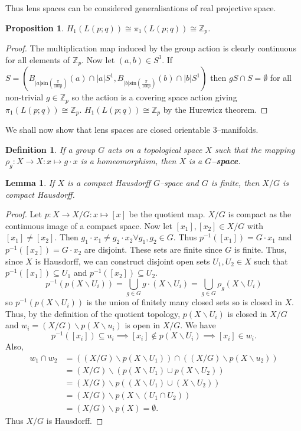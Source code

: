 \documentclass{article}
\newtheorem{definition}[theorem]{Definition}
\newtheorem{lemma}[theorem]{Lemma}
\newtheorem{proposition}[theorem]{Proposition}
\begin{document}
\noindent Thus lens spaces can be considered generalisations of real projective space.

\begin{proposition}
$H_1(L(p;q))\cong\pi_1(L(p;q))\cong \mathbb{Z}_p$.
\end{proposition}
\begin{proof}
The multiplication map induced by the group action is clearly continuous for all elements of $\mathbb{Z}_p$.
Now let $(a,b)\in S^3$. If $S=(B_{|a|\text{sin}(\frac{\pi}{100p})}(a)\cap |a|S^1,B_{|b|\text{sin}(\frac{\pi}{100p})}(b)\cap |b|S^1)$ then $gS\cap S=\emptyset$ for all non-trivial $g\in \mathbb{Z}_p$ so the action is a covering space action giving $\pi_1(L(p;q))\cong \mathbb{Z}_p$. $H_1(L(p;q))\cong \mathbb{Z}_p$ by the Hurewicz theorem.
\end{proof}

\noindent We shall now show that lens spaces are closed orientable $3$--manifolds.

\begin{definition}
If a group $G$ acts on a topological space $X$ such that the mapping $\rho_g:X\to X\colon x\mapsto g\cdot x$ is a homeomorphism, then $X$ is a \textbf{$G$--space}.
\end{definition}

\begin{lemma}
If $X$ is a compact Hausdorff $G$--space and $G$ is finite, then $X/G$ is compact Hausdorff.
\end{lemma}
\begin{proof}
Let $p:X\to X/G\colon x\mapsto[x]$ be the quotient map. $X/G$ is compact as the continuous image of a compact space. Now let $[x_1],[x_2]\in X/G$ with $[x_1]\neq [x_2]$. Then $g_1\cdot x_1\neq g_2\cdot x_2\forall g_1,g_2\in G$. Thus $p^{-1}([x_1])=G\cdot x_1$ and $p^{-1}([x_2])=G\cdot x_2$ are disjoint. These sets are finite since $G$ is finite. Thus, since $X$ is Hausdorff, we can construct disjoint open sets $U_1,U_2\in X$ such that $p^{-1}([x_1])\subseteq U_1$ and $p^{-1}([x_2])\subseteq U_2$. \[p^{-1}(p(X\backslash U_i))=\bigcup_{g\in G}g\cdot(X\backslash U_i)=\bigcup_{g\in G}\rho_g(X\backslash U_i)\] so $p^{-1}(p(X\backslash U_i))$ is the union of finitely many closed sets so is closed in $X$. Thus, by the definition of the quotient topology, $p(X\backslash U_i)$ is closed in $X/G$ and $w_i=(X/G)\backslash p(X\backslash u_i)$ is open in $X/G$. We have \[p^{-1}([x_i])\subseteq u_i\implies [x_i]\notin p(X\backslash U_i)\implies[x_i]\in w_i.\] Also, \begin{align*}w_1\cap w_2&=((X/G)\backslash p(X\backslash U_1))\cap((X/G)\backslash p(X\backslash u_2))\\&=(X/G)\backslash(p(X\backslash U_1)\cup p(X\backslash U_2))\\&=(X/G)\backslash p((X\backslash U_1)\cup (X\backslash U_2))\\&=(X/G)\backslash p(X\backslash(U_1\cap U_2))\\&=(X/G)\backslash p(X)=\emptyset.\end{align*} Thus $X/G$ is Hausdorff.
\end{proof}
\end{document}
